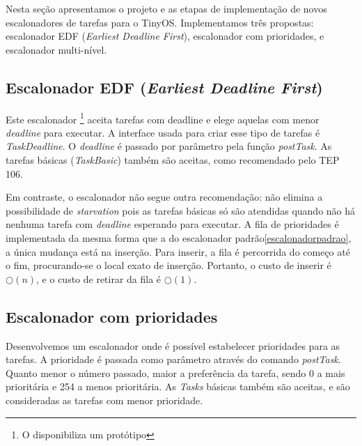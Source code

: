 Nesta seção apresentamos o projeto e as etapas de implementação de novos escalonadores
de tarefas para o TinyOS.
Implementamos três propostas: escalonador EDF (\textit{Earliest Deadline First}), escalonador com prioridades,  
e escalonador multi-nível.

\subsection{Escalonador EDF (\textit{Earliest Deadline First})}\label{escalonadoredf}
Este escalonador \footnote{O \cite{TEP106} disponibiliza um protótipo} aceita tarefas com deadline e 
elege aquelas com menor \textit{deadline} para executar. A interface usada para criar
esse tipo de tarefas é \textit{TaskDeadline}. O \textit{deadline} é passado por parâmetro pela função \textit{postTask}.
As tarefas básicas (\textit{TaskBasic}) também são aceitas, como recomendado pelo TEP 106\cite{TEP106}.

Em contraste, o escalonador não segue outra recomendação: não elimina a possibilidade de 
\textit{starvation} pois as tarefas
básicas só são atendidas quando não há nenhuma tarefa com \textit{deadline} esperando para executar. 
A fila de prioridades é implementada da mesma forma que a do escalonador 
padrão\ref{escalonadorpadrao}, a única mudança está na inserção. Para
inserir, a fila é percorrida do começo até o fim, procurando-se o local exato de inserção.
Portanto, o custo de inserir é $\bigcirc(n)$, e o custo de retirar da fila é $\bigcirc(1)$. 


\subsection{Escalonador com prioridades}\label{escalonadorprioridade}
Desenvolvemos um escalonador onde é possível estabelecer prioridades para as tarefas. 
A prioridade é passada como parâmetro através 
do comando \textit{postTask}. Quanto menor o número passado, maior a preferência da tarefa, sendo 0 a
mais prioritária e 254 a menos prioritária.
As \textit{Tasks} básicas também são aceitas, e são consideradas as tarefas com menor prioridade.

